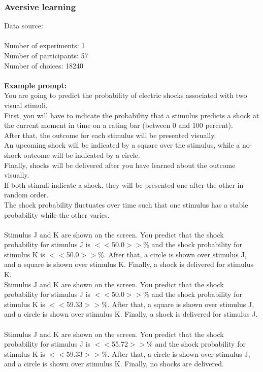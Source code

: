 \documentclass[pdflatex,sn-nature]{sn-jnl}%
\theoremstyle{thmstyleone}%
\theoremstyle{thmstyletwo}%
\theoremstyle{thmstylethree}%
\begin{document}
\subsubsection*{Aversive learning}
Data source: \cite{wise2019computational} \\ $~$ \\
Number of experiments: 1 $~$\\ 
Number of participants: 57 $~$\\ 
Number of choices: 18240 $~$\\ 
 $~$\\ 
\textbf{Example prompt:}
 $~$\\ 
You are going to predict the probability of electric shocks associated with two visual stimuli. $~$\\ 
First, you will have to indicate the probability that a stimulus predicts a shock at the current moment in time on a rating bar (between 0 and 100 percent). $~$\\ 
After that, the outcome for each stimulus will be presented visually. $~$\\ 
An upcoming shock will be indicated by a square over the stimulus, while a no-shock outcome will be indicated by a circle. $~$\\ 
Finally, shocks will be delivered after you have learned about the outcome visually. $~$\\ 
If both stimuli indicate a shock, they will be presented one after the other in random order. $~$\\ 
The shock probability fluctuates over time such that one stimulus has a stable probability while the other varies. $~$\\ 
 $~$\\ 
Stimulus J and K are shown on the screen. You predict that the shock probability for stimulus J is $<<$50.0$>>$\% and the shock probability for stimulus K is $<<$50.0$>>$\%. After that, a circle is shown over stimulus J, and a square is shown over stimulus K. Finally, a shock is delivered for stimulus K. $~$\\ 
Stimulus J and K are shown on the screen. You predict that the shock probability for stimulus J is $<<$50.0$>>$\% and the shock probability for stimulus K is $<<$59.33$>>$\%. After that, a square is shown over stimulus J, and a circle is shown over stimulus K. Finally, a shock is delivered for stimulus J. $~$\\ 
Stimulus J and K are shown on the screen. You predict that the shock probability for stimulus J is $<<$55.72$>>$\% and the shock probability for stimulus K is $<<$59.33$>>$\%. After that, a circle is shown over stimulus J, and a circle is shown over stimulus K. Finally, no shocks are delivered. $~$\\ 
\end{document}
